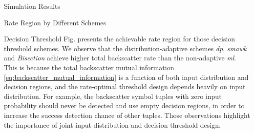 \documentclass[journal]{IEEEtran}
\begin{document}
\begin{section}{Simulation Results}
\begin{subsection}{Rate Region by Different Schemes}
\begin{subsubsection}{Decision Threshold}
			Fig.  presents the achievable rate region for those decision threshold schemes.
			We observe that the distribution-adaptive schemes \emph{\gls{dp}}, \emph{\gls{smawk}} and \emph{Bisection} achieve higher total backscatter rate than the non-adaptive \emph{\gls{ml}}.
			This is because the total backscatter mutual information \eqref{eq:backscatter_mutual_information} is a function of both input distribution and decision regions, and the rate-optimal threshold design depends heavily on input distribution.
			For example, the backscatter symbol tuples with zero input probability should never be detected and use empty decision regions, in order to increase the success detection chance of other tuples.
			Those observations highlight the importance of joint input distribution and decision threshold design.
		\end{subsubsection}

	\end{subsection}



\end{section}
\end{document}
